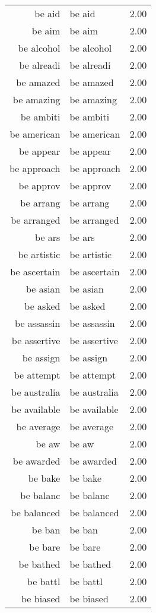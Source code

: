 \begin{table}[ht]
\begin{tabular}{rlr}
  be aid & be aid & 2.00 \\ 
  be aim & be aim & 2.00 \\ 
  be alcohol & be alcohol & 2.00 \\ 
  be alreadi & be alreadi & 2.00 \\ 
  be amazed & be amazed & 2.00 \\ 
  be amazing & be amazing & 2.00 \\ 
  be ambiti & be ambiti & 2.00 \\ 
  be american & be american & 2.00 \\ 
  be appear & be appear & 2.00 \\ 
  be approach & be approach & 2.00 \\ 
  be approv & be approv & 2.00 \\ 
  be arrang & be arrang & 2.00 \\ 
  be arranged & be arranged & 2.00 \\ 
  be ars & be ars & 2.00 \\ 
  be artistic & be artistic & 2.00 \\ 
  be ascertain & be ascertain & 2.00 \\ 
  be asian & be asian & 2.00 \\ 
  be asked & be asked & 2.00 \\ 
  be assassin & be assassin & 2.00 \\ 
  be assertive & be assertive & 2.00 \\ 
  be assign & be assign & 2.00 \\ 
  be attempt & be attempt & 2.00 \\ 
  be australia & be australia & 2.00 \\ 
  be available & be available & 2.00 \\ 
  be average & be average & 2.00 \\ 
  be aw & be aw & 2.00 \\ 
  be awarded & be awarded & 2.00 \\ 
  be bake & be bake & 2.00 \\ 
  be balanc & be balanc & 2.00 \\ 
  be balanced & be balanced & 2.00 \\ 
  be ban & be ban & 2.00 \\ 
  be bare & be bare & 2.00 \\ 
  be bathed & be bathed & 2.00 \\ 
  be battl & be battl & 2.00 \\ 
  be biased & be biased & 2.00 \\ 

\end{tabular}
\end{table}
